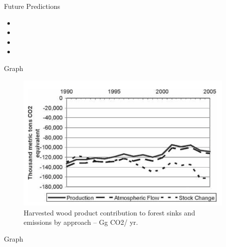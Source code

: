 \documentclass[final]{beamer}\usepackage[]{graphicx}\usepackage[]{color}
\begin{document}
\begin{frame}[fragile]
\begin{columns}[t]
\begin{column}{0.23\linewidth}
\begin{minipage}[t][.955\textheight]{\linewidth}
\begin{block}{Future Predictions}
\begin{itemize}
\item
\item
\item
\item
\end{itemize}
\vspace{0ex}
\vfill
\end{block}
\vfill

\vspace{0ex}
\begin{block}{Graph}
\vspace{0ex}
\begin{figure}
  \includegraphics[width=\linewidth]{graph1.png}
  \caption{Harvested wood product contribution to forest sinks and emissions by approach – Gg CO2/ yr.}
  \label{Figure 1}
\end{figure}
\vspace{0ex}
\end{block}
\vfill

\vspace{0ex}
\begin{block}{Graph}
\vspace{0ex}

\vspace{0ex}
\end{block}
\vfill

\end{minipage}
\end{column}%

\begin{column}{0.23\linewidth}
\begin{minipage}[t][.955\textheight]{\linewidth} 


\end{minipage}
\end{column}
\end{columns}
\end{frame}
\end{document}

